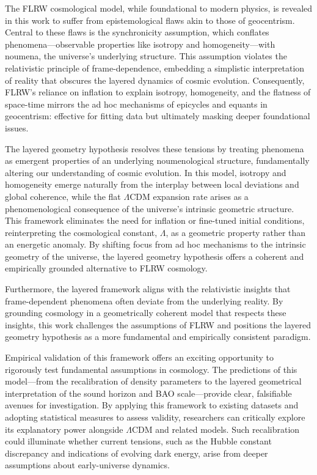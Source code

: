 \documentclass[aps,rmp,groupedaddress,twocolumn,10pt]{revtex4-2}
\begin{document}
The FLRW cosmological model, while foundational to modern physics, is revealed in this work to suffer from epistemological flaws akin to those of geocentrism. Central to these flaws is the synchronicity assumption, which conflates phenomena---observable properties like isotropy and homogeneity---with noumena, the universe's underlying structure. This assumption violates the relativistic principle of frame-dependence, embedding a simplistic interpretation of reality that obscures the layered dynamics of cosmic evolution. Consequently, FLRW's reliance on inflation to explain isotropy, homogeneity, and the flatness of space-time mirrors the ad hoc mechanisms of epicycles and equants in geocentrism: effective for fitting data but ultimately masking deeper foundational issues.

The layered geometry hypothesis resolves these tensions by treating phenomena as emergent properties of an underlying noumenological structure, fundamentally altering our understanding of cosmic evolution. In this model, isotropy and homogeneity emerge naturally from the interplay between local deviations and global coherence, while the flat $\Lambda$CDM expansion rate arises as a phenomenological consequence of the universe's intrinsic geometric structure. This framework eliminates the need for inflation or fine-tuned initial conditions, reinterpreting the cosmological constant, $\Lambda$, as a geometric property rather than an energetic anomaly. By shifting focus from ad hoc mechanisms to the intrinsic geometry of the universe, the layered geometry hypothesis offers a coherent and empirically grounded alternative to FLRW cosmology.

Furthermore, the layered framework aligns with the relativistic insights that frame-dependent phenomena often deviate from the underlying reality. By grounding cosmology in a geometrically coherent model that respects these insights, this work challenges the assumptions of FLRW and positions the layered geometry hypothesis as a more fundamental and empirically consistent paradigm.

Empirical validation of this framework offers an exciting opportunity to rigorously test fundamental assumptions in cosmology. The predictions of this model---from the recalibration of density parameters to the layered geometrical interpretation of the sound horizon and BAO scale---provide clear, falsifiable avenues for investigation. By applying this framework to existing datasets and adopting statistical measures to assess validity, researchers can critically explore its explanatory power alongside $\Lambda$CDM and related models. Such recalibration could illuminate whether current tensions, such as the Hubble constant discrepancy and indications of evolving dark energy, arise from deeper assumptions about early-universe dynamics.
\end{document}
